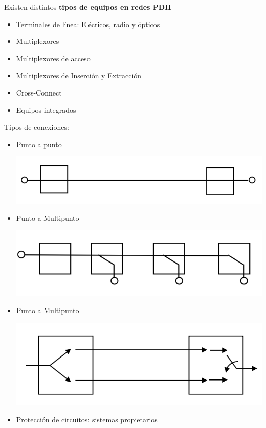 \documentclass[10pt,portrait, twocolumn]{article}
\begin{document}
Existen distintos \textbf{tipos de equipos en redes PDH}

	\begin{itemize}
		\item Terminales de línea: Elécricos, radio y ópticos
		\item Multiplexores
		\item Multiplexores de acceso
		\item Multiplexores de Inserción y Extracción
		\item Cross-Connect
		\item Equipos integrados
	\end{itemize}

Tipos de conexiones:

	\begin{itemize}
	\item Punto a punto
		\begin{center}
			\includegraphics[scale=0.2]{images/P2P}
		\end{center}
	\item Punto a Multipunto
		\begin{center}
			\includegraphics[scale=0.2]{images/P2M}
		\end{center}
	\item Punto a Multipunto
		\begin{center}
			\includegraphics[scale=0.2]{images/Uni}
		\end{center}
	\item Protección de circuitos: sistemas propietarios
	\end{itemize}
\end{document}
